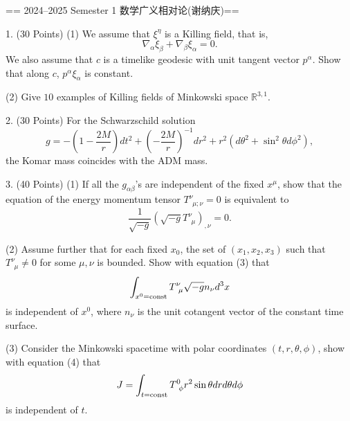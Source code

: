 
== 2024--2025 Semester 1 数学广义相对论(谢纳庆)==

1. (30 Points) (1) We assume that $\xi^\eta$ is a Killing field, that is,
\begin{equation}
    \nabla_\alpha\xi_\beta+\nabla_\beta\xi_\alpha=0.
\end{equation}
We also assume that $c$ is a timelike geodesic with unit tangent vector $p^\alpha$. Show that along $c$, $p^\alpha\xi_\alpha$ is constant.

(2) Give $10$ examples of Killing fields of Minkowski space $\mathbb{R}^{3,1}$.

2. (30 Points) For the Schwarzschild solution 
\begin{equation}
    g=-\left(1-\frac{2M}{r}\right)dt^2+\left(-\frac{2M}{r}\right)^{-1}dr^2+r^2(d\theta^2+\sin^2\theta d\phi^2),
\end{equation}
the Komar mass coincides with the ADM mass.

3. (40 Points) (1) If all the $g_{\alpha\beta}$'s are independent of the fixed $x^\mu$, show that the equation of the energy momentum tensor $T^\nu_{\;\,\mu;\nu}=0$ is equivalent to
\begin{equation}
    \frac{1}{\sqrt{-g}}(\sqrt{-g}T^\nu_{\;\,\mu})_{,\nu}=0.
\end{equation}

(2) Assume further that for each fixed $x_0$, the set of $(x_1,x_2,x_3)$ such that $T^\nu_{\;\,\mu}\neq0$ for some $\mu,\nu$ is bounded. Show with equation (3) that
\begin{equation}
    \int_{x^0={\rm const}}T^\nu_{\;\,\mu}\sqrt{-g}n_\nu d^3x
\end{equation}
is independent of $x^0$, where $n_\nu$ is the unit cotangent vector of the constant time surface.

(3) Consider the Minkowski spacetime with polar coordinates $(t,r,\theta,\phi)$, show with equation (4) that
\begin{equation}
    J=\int_{t={\rm const}}T^0_{\;\,\phi}r^2\sin\theta drd\theta d\phi
\end{equation}
is independent of $t$.

